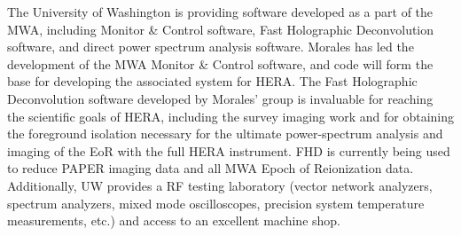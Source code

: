 \documentclass[11pt]{article}
\begin{document}
The University of Washington is providing software developed as a part of the
MWA, including Monitor \& Control software, Fast Holographic Deconvolution
software, and direct power spectrum analysis software.  Morales has led the development of the MWA Monitor \& Control software, and code 
will form the base for developing the associated system for HERA.
The Fast Holographic Deconvolution
software developed by Morales' group
is invaluable for reaching the scientific goals of
HERA, including the survey imaging work and for
obtaining the foreground isolation necessary for the ultimate power-spectrum
analysis and imaging of the EoR with the full HERA instrument.
FHD is currently being used to reduce PAPER imaging data and all MWA Epoch of
Reionization data.
Additionally, UW provides a RF
testing laboratory (vector network analyzers, spectrum analyzers, mixed mode
oscilloscopes, precision system temperature measurements, etc.) and access to
an excellent machine shop.
\end{document}

